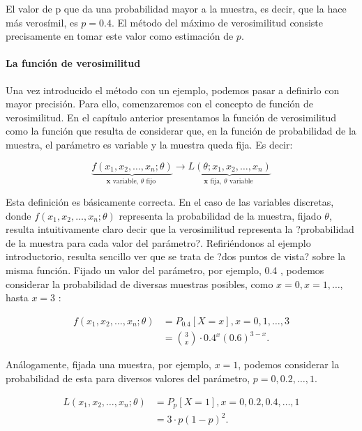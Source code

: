 \documentclass[
]{article}
\begin{document}
El valor de p que da una probabilidad mayor a la muestra, es decir, que la hace más verosímil, es \(p=0.4\). El método del máximo de verosimilitud consiste precisamente en tomar este valor como estimación de \(p\).

\paragraph{La función de verosimilitud}\label{la-funciuxf3n-de-verosimilitud}

Una vez introducido el método con un ejemplo, podemos pasar a definirlo con mayor precisión. Para ello, comenzaremos con el concepto de función de verosimilitud.
En el capítulo anterior presentamos la función de verosimilitud como la función que resulta de considerar que, en la función de probabilidad de la muestra, el parámetro es variable y la muestra queda fija. Es decir:

\[
\underbrace{f\left(x_{1}, x_{2}, \ldots, x_{n} ; \theta\right)}_{\mathbf{x} \text { variable, } \theta \text { fijo }} \longrightarrow \underbrace{L\left(\theta ; x_{1}, x_{2}, \ldots, x_{n}\right)}_{\mathbf{x} \text { fija, } \theta \text { variable }}
\]

Esta definición es básicamente correcta. En el caso de las variables discretas, donde \(f\left(x_{1}, x_{2}, \ldots, x_{n} ; \theta\right)\) representa la probabilidad de la muestra, fijado \(\theta\), resulta intuitivamente claro decir que la verosimilitud representa la ?probabilidad de la muestra para cada valor del parámetro?.
Refiriéndonos al ejemplo introductorio, resulta sencillo ver que se trata de ?dos puntos de vista? sobre la misma función. Fijado un valor del parámetro, por ejemplo, 0.4 , podemos considerar la probabilidad de diversas muestras posibles, como \(x=0, x=1, \ldots\), hasta \(x=3\) :

\[
\begin{aligned}
f\left(x_{1}, x_{2}, \ldots, x_{n} ; \theta\right) & =P_{0.4}[X=x], x=0,1, \ldots, 3 \\
& =\binom{3}{x} \cdot 0.4^{x}(0.6)^{3-x} .
\end{aligned}
\]

Análogamente, fijada una muestra, por ejemplo, \(x=1\), podemos considerar la probabilidad de esta para diversos valores del parámetro, \(p=0,0.2, \ldots, 1\).

\[
\begin{aligned}
L\left(x_{1}, x_{2}, \ldots, x_{n} ; \theta\right) & =P_{p}[X=1], x=0,0.2,0.4, \ldots, 1 \\
& =3 \cdot p(1-p)^{2} .
\end{aligned}
\]
\end{document}
